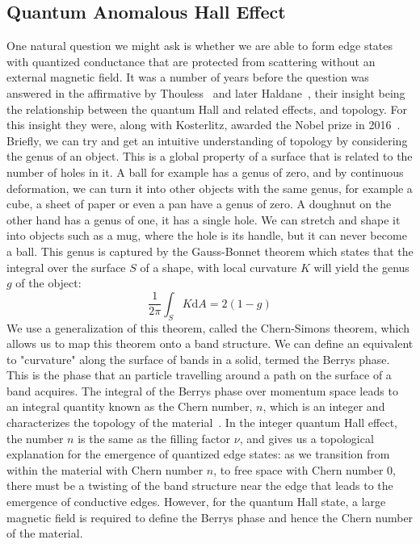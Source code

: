 \subsection{Quantum Anomalous Hall Effect}
One natural question we might ask is whether we are able to form edge states with quantized conductance that are protected from
scattering without an external magnetic field. It was a number of years before the question was answered in the affirmative by
Thouless~\cite{PhysRevLett.49.405} and later Haldane~\cite{PhysRevLett.61.2015}, their insight being the relationship between the
quantum Hall and related effects, and topology. For this insight they were, along with Kosterlitz, awarded the Nobel prize in 2016~\cite{nobel2016}.
Briefly, we can try and get an intuitive understanding of topology by considering the genus of an object. This is a global property of
a surface that is related to the number of holes in it. A ball for example has a genus of zero, and by continuous deformation, we can turn it
into other objects with the same genus, for example a cube, a sheet of paper or even a pan have a genus of zero. A doughnut on the other hand has
a genus of one, it has a single hole. We can stretch and shape it into objects such as a mug, where the hole is its handle, but it can never become a ball.
This genus is captured by the Gauss-Bonnet theorem which states that the integral over the surface $S$ of a shape, with local curvature $K$ will yield
the genus $g$ of the object:
\begin{equation}
  \frac{1}{2\pi}\int_S K \mathrm{d}A = 2(1-g)
\end{equation}
We use a generalization of this theorem, called the Chern-Simons theorem, which allows us to map this theorem onto a band structure. We can define an
equivalent to "curvature" along the surface of bands in a solid, termed the Berrys phase. This is the phase that an particle travelling around
a path on the surface of a band acquires. The integral of the Berrys phase over momentum space leads to an integral quantity known as the Chern number,
$n$, which is an integer and characterizes the topology of the material~\cite{conmatphys-011417}. In the integer quantum Hall effect, the number $n$
is the same as the filling factor $\nu$, and gives us a topological explanation for the emergence of quantized edge states: as we transition from within
the material with Chern number $n$, to free space with Chern number $0$, there must be a twisting of the band structure near the edge that leads to the emergence
of conductive edges. However, for the quantum Hall state, a large magnetic field is required to define the Berrys phase and hence the Chern number of the material.

